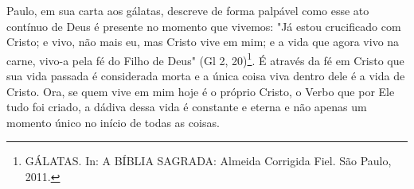 \documentclass[
    article,            %
	12pt,				%
	oneside,			%
	a4paper,			%
	chapter=TITLE,		%
	section=TITLE,		%
	english,			%
	french,				%
	spanish,			%
	brazil				%
	]{abntex2}
\begin{document}
Paulo, em sua carta aos gálatas, descreve de forma palpável como esse ato contínuo de Deus é presente no momento que vivemos: "Já estou crucificado com Cristo; e vivo, não mais eu, mas Cristo vive em mim; e a vida que agora vivo na carne, vivo-a pela fé do Filho de Deus" (Gl 2, 20)\footnote{GÁLATAS. In: A BÍBLIA SAGRADA: Almeida Corrigida Fiel. São Paulo, 2011.}. É através da fé em Cristo que sua vida passada é considerada morta e a única coisa viva dentro dele é a vida de Cristo. Ora, se quem vive em mim hoje é o próprio Cristo, o Verbo que por Ele tudo foi criado, a dádiva dessa vida é constante e eterna e não apenas um momento único no início de todas as coisas.



\pagebreak
\renewcommand{\bibname}{{REFER\^ENCIAS}}

\end{document}
